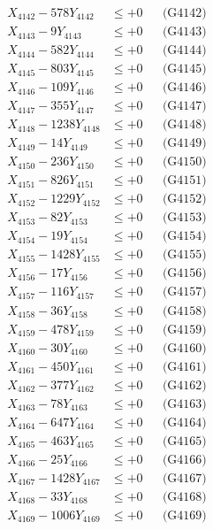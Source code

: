 \documentclass[a4paper,10pt]{article}
\begin{document}
{\begin{align}
X_{4142} - 578Y_{4142} &\leq +0 && \text{(G4142)} \\
X_{4143} - 9Y_{4143} &\leq +0 && \text{(G4143)} \\
X_{4144} - 582Y_{4144} &\leq +0 && \text{(G4144)} \\
X_{4145} - 803Y_{4145} &\leq +0 && \text{(G4145)} \\
X_{4146} - 109Y_{4146} &\leq +0 && \text{(G4146)} \\
X_{4147} - 355Y_{4147} &\leq +0 && \text{(G4147)} \\
X_{4148} - 1238Y_{4148} &\leq +0 && \text{(G4148)} \\
X_{4149} - 14Y_{4149} &\leq +0 && \text{(G4149)} \\
X_{4150} - 236Y_{4150} &\leq +0 && \text{(G4150)} \\
\allowbreak
X_{4151} - 826Y_{4151} &\leq +0 && \text{(G4151)} \\
X_{4152} - 1229Y_{4152} &\leq +0 && \text{(G4152)} \\
X_{4153} - 82Y_{4153} &\leq +0 && \text{(G4153)} \\
X_{4154} - 19Y_{4154} &\leq +0 && \text{(G4154)} \\
X_{4155} - 1428Y_{4155} &\leq +0 && \text{(G4155)} \\
X_{4156} - 17Y_{4156} &\leq +0 && \text{(G4156)} \\
X_{4157} - 116Y_{4157} &\leq +0 && \text{(G4157)} \\
X_{4158} - 36Y_{4158} &\leq +0 && \text{(G4158)} \\
X_{4159} - 478Y_{4159} &\leq +0 && \text{(G4159)} \\
X_{4160} - 30Y_{4160} &\leq +0 && \text{(G4160)} \\
\allowbreak
X_{4161} - 450Y_{4161} &\leq +0 && \text{(G4161)} \\
X_{4162} - 377Y_{4162} &\leq +0 && \text{(G4162)} \\
X_{4163} - 78Y_{4163} &\leq +0 && \text{(G4163)} \\
X_{4164} - 647Y_{4164} &\leq +0 && \text{(G4164)} \\
X_{4165} - 463Y_{4165} &\leq +0 && \text{(G4165)} \\
X_{4166} - 25Y_{4166} &\leq +0 && \text{(G4166)} \\
X_{4167} - 1428Y_{4167} &\leq +0 && \text{(G4167)} \\
X_{4168} - 33Y_{4168} &\leq +0 && \text{(G4168)} \\
X_{4169} - 1006Y_{4169} &\leq +0 && \text{(G4169)} \\

\end{align}}
\end{document}
